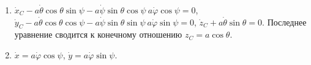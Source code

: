 \begin{enumerate}
\item $\dot{x}_C - a\dot{\theta}\cos{\theta}\sin{\psi} -
a\dot{\psi}\sin{\theta}\cos{\psi} \ a\dot{\varphi}\cos{\psi} = 0$,
$\dot{y}_C - a\dot{\theta}\cos{\theta}\cos{\psi} -
a\dot{\psi}\sin{\theta}\sin{\psi} \ a\dot{\varphi}\sin{\psi} = 0$,
$\dot{z}_C + a\dot{\theta}\sin{\theta} = 0$.
Последнее уравнение сводится к конечному отношению $z_C = a\cos{\theta}$.
\item $\dot{x} = a\dot{\varphi}\cos{\psi}$,
$\dot{y} = a\dot{\varphi}\sin{\psi}$.
\end{enumerate}
